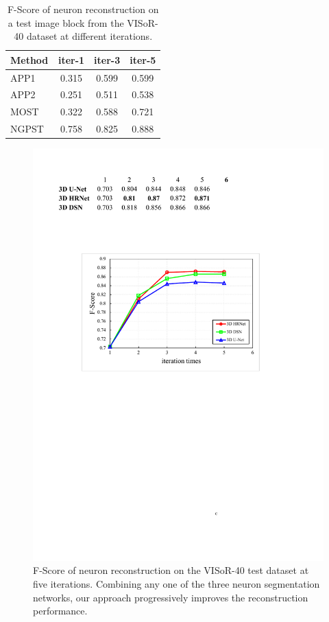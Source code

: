 \begin{table}[t]
	\centering
	\caption{F-Score of neuron reconstruction on a test image block from the VISoR-40 dataset at different iterations.%
	}
	\label{table:trace_iterations}
	\begin{tabular}{lccc}
		\toprule
		Method & iter-1 & iter-3 & iter-5\\
		\midrule
		APP1~\cite{Peng2011}
		& 0.315 & 0.599 & 0.599\\
		APP2~\cite{Xiao2013}
		& 0.251 & 0.511 & 0.538\\
		MOST~\cite{Wu2014}          
		& 0.322 & 0.588 & 0.721\\
		NGPST~\cite{Quan2015}
		& 0.758 & 0.825 & 0.888\\
		\bottomrule
	\end{tabular}
\end{table}

\begin{figure}[t]
	\centering
	\includegraphics[width=0.8\columnwidth]{./Illustrations/trace_networks_fscore11.pdf}
	\caption{F-Score of neuron reconstruction on the VISoR-40 test dataset  at five iterations. Combining any one of the three neuron segmentation networks, our approach progressively improves the reconstruction performance.}
	\label{fig:fscore_DNNs}
\end{figure}



